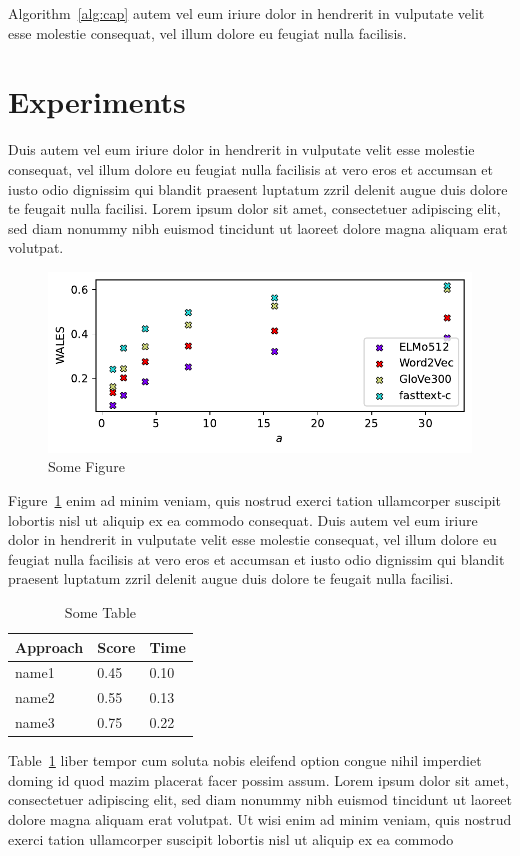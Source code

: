 \documentclass{article}
\begin{document}
Algorithm~\ref{alg:cap} autem vel eum iriure dolor in hendrerit in vulputate velit esse molestie consequat, vel illum dolore eu feugiat nulla facilisis.


\section{Experiments}
Duis autem vel eum iriure dolor in hendrerit in vulputate velit esse molestie consequat, vel illum dolore eu feugiat nulla facilisis at vero eros et accumsan et iusto odio dignissim qui blandit praesent luptatum zzril delenit augue duis dolore te feugait nulla facilisi. Lorem ipsum dolor sit amet, consectetuer adipiscing elit, sed diam nonummy nibh euismod tincidunt ut laoreet dolore magna aliquam erat volutpat.

\begin{figure}[ht]
    \centering
    \includegraphics[width=\textwidth]{figures/power.pdf}
    \caption{Some Figure}
    \label{fig:figure1}
\end{figure}

Figure~\ref{fig:figure1} enim ad minim veniam, quis nostrud exerci tation ullamcorper suscipit lobortis nisl ut aliquip ex ea commodo consequat. Duis autem vel eum iriure dolor in hendrerit in vulputate velit esse molestie consequat, vel illum dolore eu feugiat nulla facilisis at vero eros et accumsan et iusto odio dignissim qui blandit praesent luptatum zzril delenit augue duis dolore te feugait nulla facilisi.

\begin{table}[hb]
    \centering
    \begin{tabular}{lll}
        Approach & Score & Time \\
        \toprule
        name1    & 0.45  & 0.10 \\
        name2    & 0.55  & 0.13 \\
        name3    & 0.75  & 0.22
    \end{tabular}
    \caption{Some Table}
    \label{tab:table1}
\end{table}
Table~\ref{tab:table1} liber tempor cum soluta nobis eleifend option congue nihil imperdiet doming id quod mazim placerat facer possim assum. Lorem ipsum dolor sit amet, consectetuer adipiscing elit, sed diam nonummy nibh euismod tincidunt ut laoreet dolore magna aliquam erat volutpat. Ut wisi enim ad minim veniam, quis nostrud exerci tation ullamcorper suscipit lobortis nisl ut aliquip ex ea commodo



\end{document}
